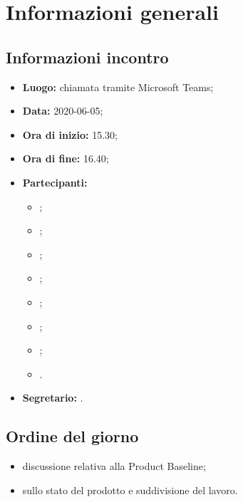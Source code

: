 \section{Informazioni generali}
\subsection{Informazioni incontro}
\begin{itemize}
	\item \textbf{Luogo:} chiamata tramite Microsoft Teams;
	\item \textbf{Data:} 2020-06-05;
	\item \textbf{Ora di inizio:} 15.30;
	\item \textbf{Ora di fine:} 16.40;
	\item \textbf{Partecipanti:}
		\begin{itemize}
			\item \VB;
			\item \LB;
			\item \NF;
			\item \EG;
			\item \FJ;
			\item \MP;
			\item \AS;
			\item \AZ.
		\end{itemize}
	\item \textbf{Segretario:} \MP.
\end{itemize}

\subsection{Ordine del giorno}
\begin{itemize}
	\item discussione relativa alla Product Baseline;
	\item sullo stato del prodotto e suddivisione del lavoro.
\end{itemize}
